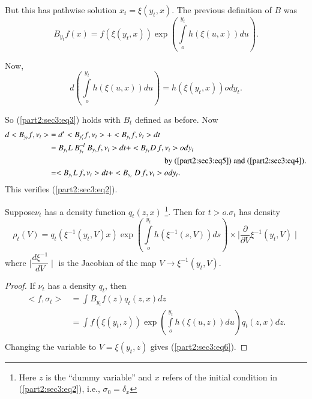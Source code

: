 But this has pathwise solution  $ x_t  = \xi (y_t, x ) $. The
previous definition of  $B$ was  
$$
B_{y_{t}} f (x) = f ( \xi (y_t,x)) \exp \left( \int \limits^{y_t}_{o}
h (\xi (u,x )) du \right).  
$$

Now,
$$
 d \left( \int \limits^{y_t}_{o} h ( \xi (u,x )) du \right) =  h  (
 \xi ( y_t,x )) ody_t.  
$$

So (\ref{part2:sec3:eq3}) holds with $B_t$ defined as before. Now 
\begin{align*}
  d < B_{y_{t}} f, \nu_t >  &= d' < B_{y'_t} f,\nu_t > + < B_{y_t} f,
  \dot{\nu}_t > dt \\ 
  &= B_{y_t}  L ~ B_{y_t}^{-l} ~ B_{y_t} f, \nu_t > dt +
  <B_{y_t} D \, f, \nu_t > ody_t\\  
  & \hspace{5cm}\text{ by  (\ref{part2:sec3:eq5})  and
    (\ref{part2:sec3:eq4})}.\\  
  &=  <B_{y_t} L \,f, \nu_t > dt  + <  B_{y_t} ~  D\, f, \nu_t > ody_t.
\end{align*}
This verifies (\ref{part2:sec3:eq2}).

\begin{prop} %
 Suppose\pageoriginale  $\nu_t $ has a density function  $q_t (z,x
 )$  \footnote{Here $ z $ is the  ``dummy
   variable'' and $x$ refers  of the initial condition in  
   (\ref{part2:sec3:eq2}), i.e., $\sigma_0 = \delta_x $}.  Then  for  $ t > o. \sigma_t $
   has density   
   \begin{equation} 
   \rho_t (V) = q_t ( \xi^{-1} ( y_t, V ) x) \exp \left( \int \limits^{
     y_t}_{o} h ( \xi^{-1} ( s, V )) ds \right)  
     \times \mid  \frac{\partial}{\partial V} \xi^{-1} ( y_t, V)
     \mid \tag{6}\label{part2:sec3:eq6}  
   \end{equation}
   where $ \mid \dfrac{d \xi^{-1}}{d V} \mid  $  is the Jacobian of
   the map  $ V  \rightarrow \xi^{-1} ( y_t, V )$. 
\end{prop}

\begin{proof}
  If $\nu_t$ has a density $q_t$, then
  \begin{align*}
    < f, \sigma_t > &= \int B_{y_{t}} f (z) q_t (z,x) dz \\
    &= \int f(\xi ( y_t,z )) \exp ( \int \limits^{y_t}_{o} h ( \xi
    (u,z ))du ) q_t (z,x) dz. \\ 
  \end{align*}
  Changing the variable to $ V = \xi ( y_t,z ) $ gives  (\ref{part2:sec3:eq6}).
\end{proof}


